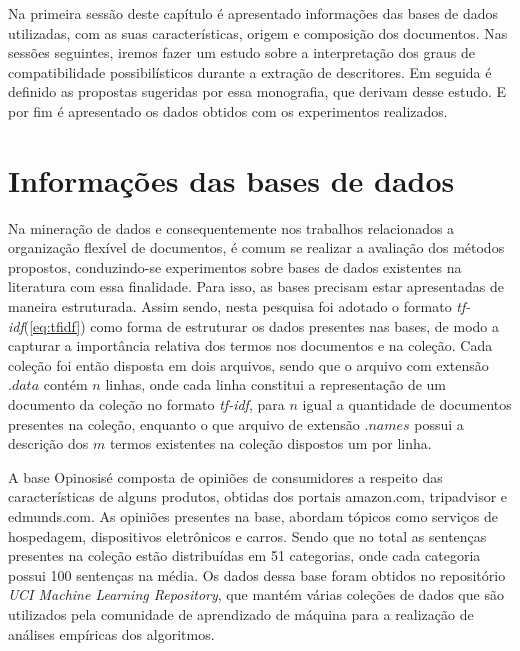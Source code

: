Na primeira sessão deste capítulo é apresentado informações das bases de dados utilizadas, com as
suas características, origem e composição dos documentos. Nas sessões seguintes, iremos fazer um
estudo sobre a interpretação dos graus de compatibilidade possibilísticos durante a extração de
descritores. Em seguida é definido as propostas sugeridas por essa monografia, que derivam desse
estudo. E por fim é apresentado os dados obtidos com os experimentos realizados.

\section{Informações das bases de dados}
\label{section:datasets}

Na mineração de dados e consequentemente nos trabalhos relacionados a organização flexível de
documentos, é comum se realizar a avaliação dos métodos propostos, conduzindo-se experimentos sobre
bases de dados existentes na literatura com essa finalidade\cite{Rossi2013}. Para isso, as bases
precisam estar apresentadas de maneira estruturada. Assim sendo, nesta pesquisa foi adotado o formato
{\it tf-idf\/}(\ref{eq:tfidf}) como forma de estruturar os dados presentes nas bases, 
de modo a capturar a
importância relativa dos termos nos documentos e na coleção. Cada coleção foi então disposta em dois
arquivos, sendo que o arquivo com extensão $.data$ contém $n$ linhas, onde cada linha constitui a 
representação de um
documento da coleção no formato {\it tf-idf\/}, para $n$ igual a quantidade de documentos 
presentes na
coleção, enquanto o que arquivo de extensão $.names$ possui a descrição dos $m$ termos existentes na
coleção dispostos um por linha.

A base Opinosis\footnotemark é composta de opiniões de consumidores a respeito das características de alguns
produtos, obtidas dos portais amazon.com, tripadvisor e edmunds.com. As opiniões presentes na base,
abordam tópicos como serviços de hospedagem, dispositivos eletrônicos e carros. Sendo que no total
as sentenças presentes na coleção estão distribuídas em 51 categorias, onde cada categoria possui
100 sentenças na média. Os dados dessa base
foram obtidos no repositório {\it UCI Machine Learning Repository\/}\cite{Frank2010}, 
que mantém várias coleções de
dados que são utilizados pela comunidade de aprendizado de máquina para a realização de análises
empíricas dos algoritmos.

